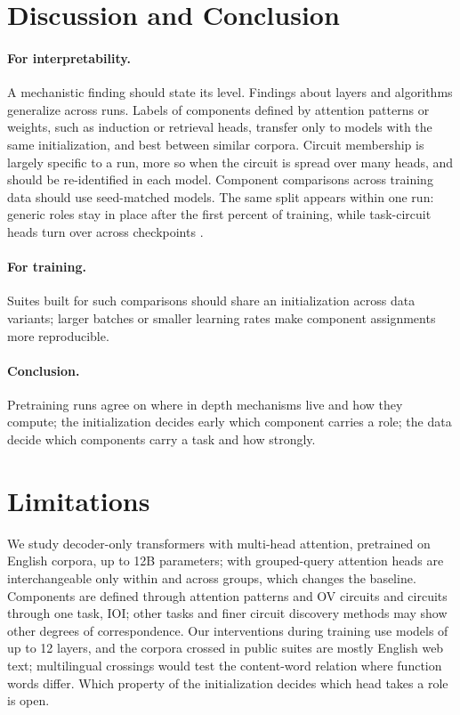\documentclass[11pt]{article}
\begin{document}
\section{Discussion and Conclusion}
\label{sec:conclusion}

\paragraph{For interpretability.}
A mechanistic finding should state its level.
Findings about layers and algorithms generalize across runs.
Labels of components defined by attention patterns or weights, such as induction or retrieval heads, transfer only to models with the same initialization, and best between similar corpora.
Circuit membership is largely specific to a run, more so when the circuit is spread over many heads, and should be re-identified in each model.
Component comparisons across training data should use seed-matched models. The same split appears within one run: generic roles stay in place after the first percent of training, while task-circuit heads turn over across checkpoints \citep{tigges2024llm}.

\paragraph{For training.}
Suites built for such comparisons should share an initialization across data variants; larger batches or smaller learning rates make component assignments more reproducible.

\paragraph{Conclusion.}
Pretraining runs agree on where in depth mechanisms live and how they compute; the initialization decides early which component carries a role; the data decide which components carry a task and how strongly.

\section*{Limitations}
We study decoder-only transformers with multi-head attention, pretrained on English corpora, up to 12B parameters; with grouped-query attention heads are interchangeable only within and across groups, which changes the baseline.
Components are defined through attention patterns and OV circuits and circuits through one task, IOI; other tasks and finer circuit discovery methods may show other degrees of correspondence.
Our interventions during training use models of up to 12 layers, and the corpora crossed in public suites are mostly English web text; multilingual crossings would test the content-word relation where function words differ.
Which property of the initialization decides which head takes a role is open.
\end{document}
